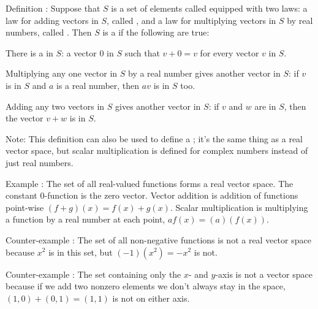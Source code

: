 \documentclass[11pt, openright]{book}
\begin{document}
\begin{dent}{Definition :}
    Suppose that $S$ is a set of elements called  equipped with two laws: a law for adding vectors in $S$, called , and a law for multiplying vectors in $S$ by real numbers, called . Then $S$ is a  if  the following are true:\\
    \begin{items}{-22pt}{-35pt}
        \item There is a  in $S$: a vector $0$ in $S$ such that $v+0=v$ for every vector $v$ in $S$.
        \item Multiplying any one vector in $S$ by a real number gives another vector in $S$: if $v$ is in $S$ and $a$ is a real number, then $av$ is in $S$ too.
        \item Adding any two vectors in $S$ gives another vector in $S$: if $v$ and $w$ are in $S$, then the vector $v+w$ is in $S$.
    \end{items}
    \begin{dent}{}

        Note: This definition can also be used to define a ; it's the same thing as a real vector space, but scalar multiplication is defined for complex numbers instead of just real numbers.
    \end{dent}
\end{dent}

\begin{dent}{Example :}
    The set of all real-valued functions forms a real vector space. The constant $0$-function is the zero vector. Vector addition is addition of functions point-wise $(f+g)(x)=f(x)+g(x)$. Scalar multiplication is multiplying a function by a real number at each point, $af(x)=(a)(f(x))$.
\end{dent}

\begin{dent}{Counter-example :} The set of all non-negative functions is not a real vector space because $x^2$ is in this set, but $(-1)(x^2)=-x^2$ is not.
\end{dent}

\begin{dent}{Counter-example :}
    The set containing only the $x$- and $y$-axis is not a vector space because if we add two nonzero elements we don't always stay in the space, $(1,0)+(0,1)=(1,1)$ is not on either axis.
\end{dent}
\end{document}
